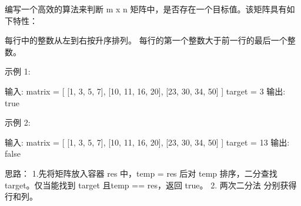 编写一个高效的算法来判断 m x n 矩阵中，是否存在一个目标值。该矩阵具有如下特性：

    每行中的整数从左到右按升序排列。
    每行的第一个整数大于前一行的最后一个整数。

示例 1:

输入:
matrix = [
  [1,   3,  5,  7],
  [10, 11, 16, 20],
  [23, 30, 34, 50]
]
target = 3
输出: true

示例 2:

输入:
matrix = [
  [1,   3,  5,  7],
  [10, 11, 16, 20],
  [23, 30, 34, 50]
]
target = 13
输出: false





























思路：
1.先将矩阵放入容器 res 中，temp = res 后对 temp 排序，二分查找 target。仅当能找到 target 且temp == res，返回 true。
2. 两次二分法 分别获得 行和列。






























